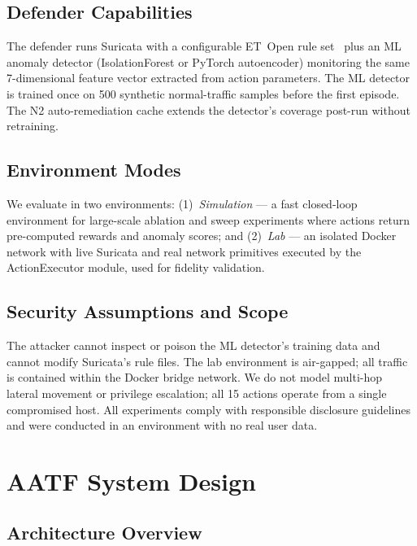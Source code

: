 \documentclass[sigconf]{acmart}
\begin{document}
\subsection{Defender Capabilities}

The defender runs Suricata with a configurable ET~Open rule
set~\cite{etopen2024} plus an ML anomaly detector (IsolationForest or
PyTorch autoencoder) monitoring the same 7-dimensional feature vector
extracted from action parameters. The ML detector is trained once on
500 synthetic normal-traffic samples before the first episode. The N2
auto-remediation cache extends the detector's coverage post-run without
retraining.

\subsection{Environment Modes}

We evaluate in two environments: (1)~\emph{Simulation} --- a fast
closed-loop environment for large-scale ablation and sweep experiments
where actions return pre-computed rewards and anomaly scores; and
(2)~\emph{Lab} --- an isolated Docker network with live Suricata and
real network primitives executed by the ActionExecutor module, used for
fidelity validation.

\subsection{Security Assumptions and Scope}

The attacker cannot inspect or poison the ML detector's training data
and cannot modify Suricata's rule files. The lab environment is
air-gapped; all traffic is contained within the Docker bridge network.
We do not model multi-hop lateral movement or privilege escalation;
all 15 actions operate from a single compromised host. All experiments
comply with responsible disclosure guidelines and were conducted in
an environment with no real user data.

\section{AATF System Design}
\label{sec:design}

\subsection{Architecture Overview}
\label{sec:arch}
\end{document}
